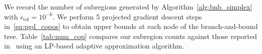 \documentclass[12pt]{article}
\theoremstyle{remark}
\begin{document}
We record the number of subregions generated by Algorithm~\ref{alg:bnb_simplex} with $\epsilon_{\text{tol}}=10^{-6}$. 
We perform 5 projected gradient descent steps in~\eqref{eq:pgd_copos} to obtain upper bounds at each node of the branch-and-bound tree. 
Table~\ref{tab:num_cop} compares our subregion counts against those reported in~\cite{Bundfuss2009} using an LP-based adaptive approximation algorithm. 
\end{document}

